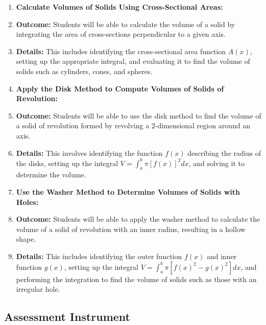 \begin{enumerate}
    \item \textbf{Calculate Volumes of Solids Using Cross-Sectional Areas:}
    \item \textbf{Outcome:} Students will be able to calculate the volume of a solid by integrating the area of cross-sections perpendicular to a given axis.
    \item \textbf{Details:} This includes identifying the cross-sectional area function \( A(x) \), setting up the appropriate integral, and evaluating it to find the volume of solids such as cylinders, cones, and spheres.
    \item \textbf{Apply the Disk Method to Compute Volumes of Solids of Revolution:}
    \item \textbf{Outcome:} Students will be able to use the disk method to find the volume of a solid of revolution formed by revolving a 2-dimensional region around an axis.
    \item \textbf{Details:} This involves identifying the function \( f(x) \) describing the radius of the disks, setting up the integral \( V = \int_a^b \pi [f(x)]^2 dx \), and solving it to determine the volume.
    \item \textbf{Use the Washer Method to Determine Volumes of Solids with Holes:}
    \item \textbf{Outcome:} Students will be able to apply the washer method to calculate the volume of a solid of revolution with an inner radius, resulting in a hollow shape.
    \item \textbf{Details:} This includes identifying the outer function \( f(x) \) and inner function \( g(x) \), setting up the integral \( V = \int_a^b \pi [f(x)^2 - g(x)^2] dx \), and performing the integration to find the volume of solids such as those with an irregular hole.
\end{enumerate}

\subsection{Assessment Instrument}

